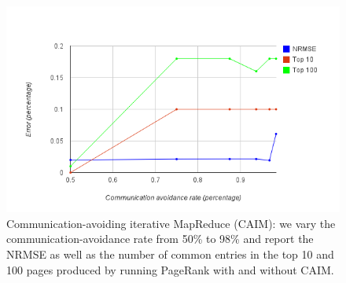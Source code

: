 \begin{figure}[!ht]
\centering\includegraphics[width=\columnwidth]{figs/comm_avoid_PR.png}
\vspace{-1.8em}
\caption{Communication-avoiding iterative MapReduce (CAIM): we vary the communication-avoidance rate from 50\% to 98\% and report the NRMSE as well as the number of common entries in the top 10 and 100 pages produced by running PageRank with and without CAIM.}
\label{fig:CAIM}
\vspace{.7em}
\end{figure}
